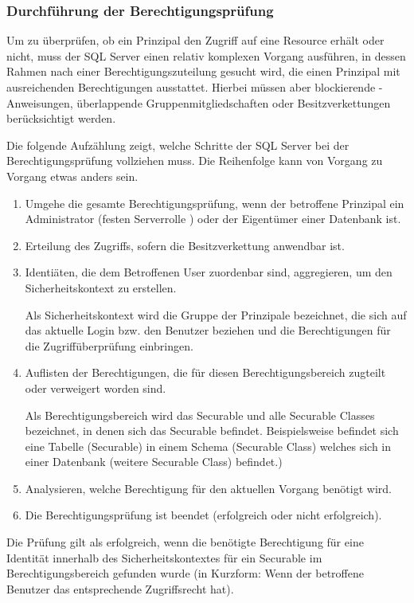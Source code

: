         \subsubsection{Durchführung der Berechtigungsprüfung}
          Um zu überprüfen, ob ein Prinzipal den Zugriff auf eine Resource
          erhält oder nicht, muss der SQL Server einen relativ komplexen Vorgang
          ausführen, in dessen Rahmen nach einer Berechtigungszuteilung gesucht
          wird, die einen Prinzipal mit ausreichenden Berechtigungen ausstattet.
          Hierbei müssen aber blockierende \DENY-Anweisungen, überlappende
          Gruppenmitgliedschaften oder Besitzverkettungen berücksichtigt werden.
          
          Die folgende Aufzählung zeigt, welche Schritte der SQL Server bei der
          Berechtigungsprüfung vollziehen muss. Die Reihenfolge kann von Vorgang
          zu Vorgang etwas anders sein.
          \begin{enumerate}
            \item Umgehe die gesamte Berechtigungsprüfung, wenn der betroffene
            Prinzipal ein Administrator (festen Serverrolle
            ) oder der Eigentümer einer Datenbank ist.
            \item Erteilung des Zugriffs, sofern die Besitzverkettung anwendbar
            ist.
            \item Identiäten, die dem Betroffenen User zuordenbar sind,
            aggregieren, um den Sicherheitskontext zu erstellen.
            \begin{merke}
              Als Sicherheitskontext wird die Gruppe der Prinzipale bezeichnet,
              die sich auf das aktuelle Login bzw. den Benutzer beziehen und die
              Berechtigungen für die Zugriffüberprüfung einbringen. 
            \end{merke}
            \item Auflisten der Berechtigungen, die für diesen
            Berechtigungsbereich zugteilt oder verweigert worden sind.
            \begin{merke}
              Als Berechtigungsbereich wird das Securable und alle Securable
              Classes bezeichnet, in denen sich das Securable befindet.
              Beispielsweise befindet sich eine Tabelle (Securable) in einem
              Schema (Securable Class) welches sich in einer Datenbank
              (weitere Securable Class) befindet.)
            \end{merke}
            \item Analysieren, welche Berechtigung für den aktuellen Vorgang
            benötigt wird.
            \item Die Berechtigungsprüfung ist beendet (erfolgreich oder nicht
            erfolgreich).
          \end{enumerate}
          Die Prüfung gilt als erfolgreich, wenn die benötigte Berechtigung für
          eine Identität innerhalb des Sicherheitskontextes für ein Securable im
          Berechtigungsbereich gefunden wurde (in Kurzform: Wenn der betroffene
          Benutzer das entsprechende Zugriffsrecht hat).
